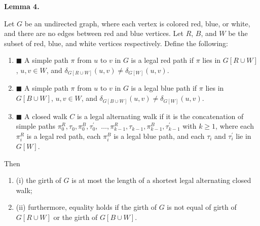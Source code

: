 \par
\par
\par\medskip\noindent\textbf{Lemma 4.}\par
Let $G$ be an undirected graph, where each vertex is colored red, blue, or white, and there are no edges between red and blue vertices. Let $R$, $B$, and $W$ be the subset of red, blue, and white vertices respectively. Define the following:
\par
\begin{enumerate}
\item[]  $\blacksquare$ 
A simple path $\pi$ from $u$ to $v$ in $G$ is a legal red path if $\pi$ lies in $G[R\cup W]$, $u,v\in W$, and $\delta_{G[R\cup W]}(u,v)\neq\delta_{G[W]}(u,v)$.
\par
\par
\item[]  $\blacksquare$ 
A simple path $\pi$ from $u$ to $v$ in $G$ is a legal blue path if $\pi$ lies in $G[B\cup W]$, $u,v\in W$, and $\delta_{G[B\cup W]}(u,v)\neq\delta_{G[W]}(u,v)$.
\par
\par
\item[]  $\blacksquare$ 
A closed walk $C$ is a legal alternating walk if it is the concatenation of simple paths $\pi^{R}_{0},\tau_{0},\pi^{B}_{0},\tau^{\prime}_{0},$ $\ldots,\pi^{R}_{k-1},\tau_{k-1},\pi^{B}_{k-1},\tau^{\prime}_{k-1}$ with $k\geq 1$, where each $\pi^{R}_{i}$ is a legal red path, each $\pi^{B}_{i}$ is a legal blue path, and each $\tau_{i}$ and $\tau^{\prime}_{i}$ lie in $G[W]$.
\par
\par
\end{enumerate}
Then
\par
\begin{enumerate}
\item[]  (i) 
the girth of $G$ is at most the length of a shortest legal alternating closed walk;
\par
\par
\item[]  (ii) 
furthermore, equality holds if the girth of $G$ is not equal of girth of $G[R\cup W]$ or the girth of $G[B\cup W]$.
\par
\par
\end{enumerate}
\par
\par

